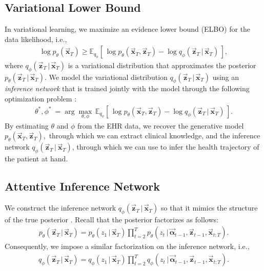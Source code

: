 \documentclass [PhD] {uclathes}
\begin{document}
\subsection{Variational Lower Bound}
\label{ch5sec31}
In variational learning, we maximize an evidence lower bound (ELBO) for the data likelihood, i.e., 
\begin{align}
\log p_{\theta}(\boldsymbol{\vec{x}}_{T}) \geq \mathbb{E}_{q_{\phi}} \left[\, \log p_{\theta}(\boldsymbol{\vec{x}}_{T},\boldsymbol{\vec{z}}_{T}) - \log q_{\phi}(\boldsymbol{\vec{z}}_{T}\,|\,\boldsymbol{\vec{x}}_{T}) \,\right], \nonumber 
\end{align}
where $q_{\phi}(\boldsymbol{\vec{z}}_{T}\,|\,\boldsymbol{\vec{x}}_{T})$ is a variational distribution that approximates the posterior $p_{\theta}(\boldsymbol{\vec{z}}_{T}\,|\,\boldsymbol{\vec{x}}_{T})$. We model the variational distribution $q_{\phi}(\boldsymbol{\vec{z}}_{T}\,|\,\boldsymbol{\vec{x}}_{T})$ using an {\it inference network} that is trained jointly with the model through the following optimization problem \cite{mnih2014neural,kingma2013auto}:
\begin{align}
\theta^*, \phi^* \ = \arg \max_{\theta, \phi}\, \mathbb{E}_{q_{\phi}} \left[\,\log p_{\theta}(\boldsymbol{\vec{x}}_{T},\boldsymbol{\vec{z}}_{T}) - \log q_{\phi}(\boldsymbol{\vec{z}}_{T}\,|\,\boldsymbol{\vec{x}}_{T}) \,\right]. 
\label{ch5eq7}
\end{align}
By estimating $\theta$ and $\phi$ from the EHR data, we recover the generative model $p_{\theta}(\boldsymbol{\vec{x}}_{T},\boldsymbol{\vec{z}}_{T})$,~through which we can extract clinical knowledge, and the inference network $q_{\phi}(\boldsymbol{\vec{z}}_{T}\,|\,\boldsymbol{\vec{x}}_{T})$, through which we can use to infer the health trajectory of the patient at hand.

\subsection{Attentive Inference Network} %
\label{ch5sec32}
We construct the inference network $q_{\phi}(\boldsymbol{\vec{z}}_{T}\,|\,\boldsymbol{\vec{x}}_{T})$ so that it mimics the structure of the true posterior \cite{krishnan2017structured}. Recall that the posterior factorizes as follows:
\begin{align}
p_{\theta}(\boldsymbol{\vec{z}}_T\,|\,\boldsymbol{\vec{x}}_T) = p_{\theta}(z_1\,|\,\boldsymbol{\vec{x}}_T) \prod^{T}_{t=2} p_{\theta}(z_t\,|\,\boldsymbol{\vec{\alpha}}_{t-1},\boldsymbol{\vec{z}}_{t-1},\boldsymbol{\vec{x}}_{t:T}). \nonumber 
\end{align}
Consequently, we impose a similar factorization on the inference network, i.e., 
\begin{align}
q_{\phi}(\boldsymbol{\vec{z}}_T\,|\,\boldsymbol{\vec{x}}_T) = q_{\phi}(z_1\,|\,\boldsymbol{\vec{x}}_T) \prod^{T}_{t=2} q_{\phi}(z_t\,|\,\boldsymbol{\vec{\alpha}}_{t-1},\boldsymbol{\vec{z}}_{t-1},\boldsymbol{\vec{x}}_{t:T}). 
\label{ch5eq8}
\end{align}
\end{document}
